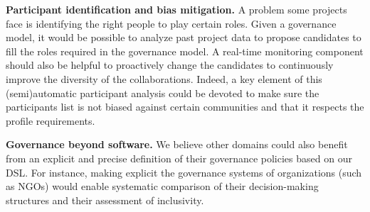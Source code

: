 \smallskip
\noindent\textbf{Participant identification and bias mitigation.}
A problem some projects face is identifying the right people to play certain roles. 
Given a governance model, it would be possible to analyze past project data to propose candidates to fill the roles required in the governance model. 
A real-time monitoring component should also be helpful to proactively change the candidates to continuously improve the diversity of the collaborations. Indeed, a key element of this (semi)automatic participant analysis could be devoted to make sure the participants list is not biased against certain communities and that it respects the profile requirements. 


\smallskip
\noindent\textbf{Governance beyond software.}
We believe other domains could also benefit from an explicit and precise definition of their governance policies based on our DSL. 
For instance, making explicit the governance systems of organizations (such as NGOs) would enable systematic comparison of their decision-making structures and their assessment of inclusivity. %